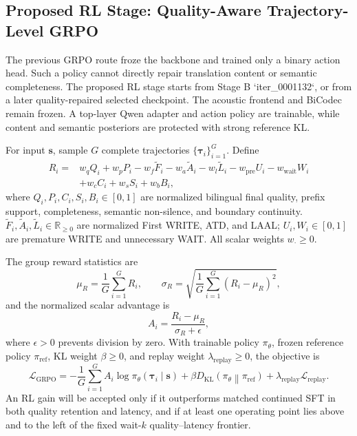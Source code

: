 \documentclass[11pt,a4paper]{article}
\newcommand{\vect}[1]{\bm{#1}}
\newcommand{\R}{\mathbb{R}}
\newcommand{\Loss}{\mathcal{L}}
\newcommand{\KL}{D_{\mathrm{KL}}}
\begin{document}
\subsection{Proposed RL Stage: Quality-Aware Trajectory-Level GRPO}

The previous GRPO route froze the backbone and trained only a binary action head. Such a policy cannot directly repair translation content or semantic completeness. The proposed RL stage starts from Stage B `iter\_0001132`, or from a later quality-repaired selected checkpoint. The acoustic frontend and BiCodec remain frozen. A top-layer Qwen adapter and action policy are trainable, while content and semantic posteriors are protected with strong reference KL.

For input $\vect{s}$, sample $G$ complete trajectories $\{\vect{\tau}_i\}_{i=1}^{G}$. Define
\begin{align}
 R_i={}&w_q Q_i+w_p P_i-w_f\widetilde{F}_i-w_a\widetilde{A}_i
 -w_l\widetilde{L}_i-w_{\mathrm{pre}}U_i-w_{\mathrm{wait}}W_i\nonumber\\
 &+w_c C_i+w_s S_i+w_b B_i,
 \label{eq:reward}
\end{align}
where $Q_i,P_i,C_i,S_i,B_i\in[0,1]$ are normalized bilingual final quality, prefix support, completeness, semantic non-silence, and boundary continuity. $\widetilde{F}_i,\widetilde{A}_i,\widetilde{L}_i\in\R_{\ge0}$ are normalized First WRITE, ATD, and LAAL; $U_i,W_i\in[0,1]$ are premature WRITE and unnecessary WAIT. All scalar weights $w_\cdot\ge0$.

The group reward statistics are
\begin{equation}
 \mu_R=\frac1G\sum_{i=1}^G R_i,
 \qquad
 \sigma_R=\sqrt{\frac1G\sum_{i=1}^G(R_i-\mu_R)^2},
 \label{eq:groupstats}
\end{equation}
and the normalized scalar advantage is
\begin{equation}
 A_i=\frac{R_i-\mu_R}{\sigma_R+\epsilon},
 \label{eq:advantage}
\end{equation}
where $\epsilon>0$ prevents division by zero. With trainable policy $\pi_\theta$, frozen reference policy $\pi_{\mathrm{ref}}$, KL weight $\beta\ge0$, and replay weight $\lambda_{\mathrm{replay}}\ge0$, the objective is
\begin{equation}
 \Loss_{\mathrm{GRPO}}
 =-\frac1G\sum_{i=1}^{G}A_i\log\pi_\theta(\vect{\tau}_i\mid\vect{s})
 +\beta\KL\!\left(\pi_\theta\middle\|\pi_{\mathrm{ref}}\right)
 +\lambda_{\mathrm{replay}}\Loss_{\mathrm{replay}}.
 \label{eq:grpo}
\end{equation}
An RL gain will be accepted only if it outperforms matched continued SFT in both quality retention and latency, and if at least one operating point lies above and to the left of the fixed wait-$k$ quality--latency frontier.
\end{document}
